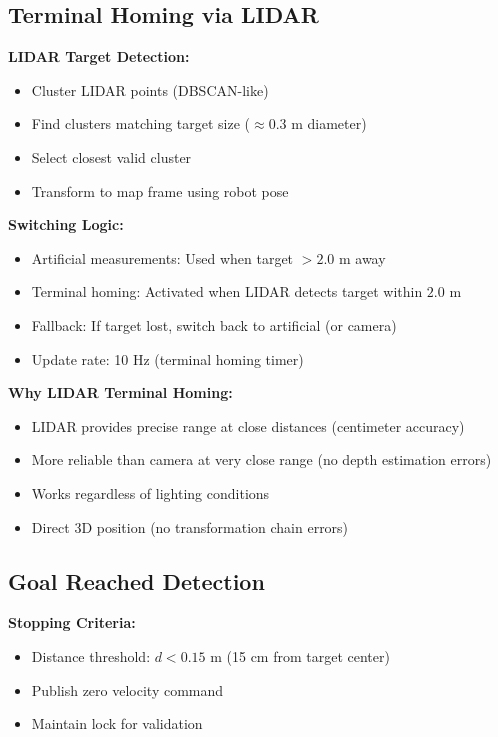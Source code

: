 \documentclass[11pt]{article}
\begin{document}
\subsection{Terminal Homing via LIDAR}

\textbf{LIDAR Target Detection:}
\begin{itemize}
    \item Cluster LIDAR points (DBSCAN-like)
    \item Find clusters matching target size ($\approx 0.3$ m diameter)
    \item Select closest valid cluster
    \item Transform to map frame using robot pose
\end{itemize}

\textbf{Switching Logic:}
\begin{itemize}
    \item Artificial measurements: Used when target $> 2.0$ m away
    \item Terminal homing: Activated when LIDAR detects target within $2.0$ m
    \item Fallback: If target lost, switch back to artificial (or camera)
    \item Update rate: 10 Hz (terminal homing timer)
\end{itemize}

\textbf{Why LIDAR Terminal Homing:}
\begin{itemize}
    \item LIDAR provides precise range at close distances (centimeter accuracy)
    \item More reliable than camera at very close range (no depth estimation errors)
    \item Works regardless of lighting conditions
    \item Direct 3D position (no transformation chain errors)
\end{itemize}

\subsection{Goal Reached Detection}

\textbf{Stopping Criteria:}
\begin{itemize}
    \item Distance threshold: $d < 0.15$ m (15 cm from target center)
    \item Publish zero velocity command
    \item Maintain lock for validation
\end{itemize}
\end{document}
